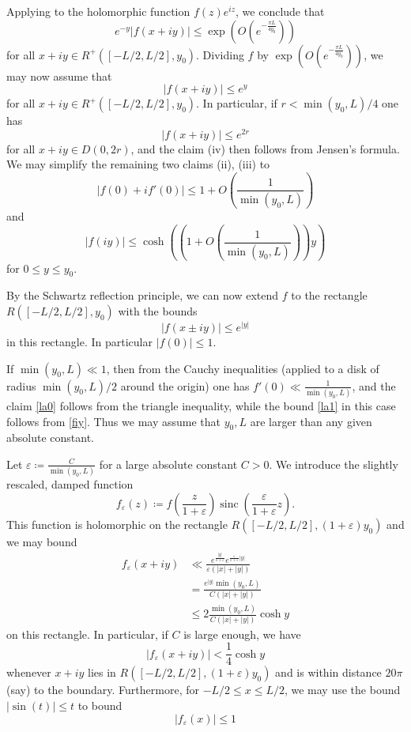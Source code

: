 \documentclass[12pt]{amsart}
\newcommand{\eps}{\varepsilon}
\newcommand{\sinc}{\operatorname{sinc}}
\begin{document}
Applying  to the holomorphic function $f(z) e^{iz}$, we conclude that
$$
 e^{-y} |f(x + iy)| \leq \exp\left(O( e^{-\frac{\pi L}{4y_0}} )\right)
$$
for all $x+iy \in R^+([-L/2,L/2], y_0)$.  Dividing $f$ by $\exp\left(O( e^{-\frac{\pi L}{4y_0}} )\right)$, we may now assume that
\begin{equation}\label{fiy}
 |f(x + iy)| \leq e^y
\end{equation}
for all $x+iy \in R^+([-L/2,L/2], y_0)$.  In particular, if $r < \min(y_0,L)/4$ one has
$$ |f(x+iy)| \leq e^{2r}$$
for all $x+iy \in D(0,2r)$, and the claim (iv) then follows from Jensen's formula.  We may simplify the remaining two claims (ii), (iii) to
\begin{equation}\label{la0}
 |f(0) + i f'(0)| \leq 1 + O\left(\frac{1}{\min(y_0,L)}\right)
\end{equation}
and
\begin{equation}\label{la1}
     |f(iy)| \leq \cosh \left( \left( 1 + O\left(\frac{1}{\min(y_0,L)}\right) \right) y\right)
\end{equation}
for $0 \leq y \leq y_0$.

By the Schwartz reflection principle, we can now extend $f$ to the rectangle $R([-L/2,L/2], y_0)$
with the bounds
$$ |f(x \pm iy)| \leq e^{|y|}$$
in this rectangle. In particular $|f(0)| \leq 1$.

If $\min(y_0,L) \ll 1$, then from the Cauchy inequalities (applied to a disk of radius $\min(y_0,L)/2$ around the origin) one has $f'(0) \ll \frac{1}{\min(y_0,L)}$, and the claim \eqref{la0} follows from the triangle inequality, while the bound \eqref{la1} in this case follows from \eqref{fiy}.  Thus we may assume that $y_0, L$ are larger than any given absolute constant.

Let $\eps \coloneqq \frac{C}{\min(y_0,L)}$ for a large absolute constant $C>0$.  We introduce the slightly rescaled, damped function
\begin{equation}\label{feps-def}
 f_{\eps}(z) \coloneqq f\left(\frac{z}{1+\eps}\right) \sinc\left(\frac{\eps}{1+\eps} z\right).
\end{equation}
This function is holomorphic on the rectangle $R([-L/2,L/2], (1+\eps) y_0)$
and we may bound
\begin{align*}
f_{\eps}(x+iy) &\ll \frac{e^{\frac{|y|}{1+\eps}} e^{\frac{\eps}{1+\eps} |y|}}{\eps (|x| + |y|)} \\
&= \frac{e^{|y|} \min(y_0,L)}{C(|x| + |y|)} \\
&\leq 2 \frac{\min(y_0,L)}{C(|x| + |y|)} \cosh y
\end{align*}
on this rectangle.  In particular, if $C$ is large enough, we have
\begin{equation}\label{f14}
 |f_{\eps}(x+iy)| < \frac{1}{4} \cosh y
\end{equation}
whenever $x+iy$ lies in $R([-L/2,L/2], (1+\eps) y_0)$ and is within distance $20\pi$ (say) to the boundary. Furthermore, for $-L/2 \leq x \leq L/2$, we may use the bound $|\sin(t)| \leq t$ to bound
\begin{equation}\label{feps}
 |f_{\eps}(x)| \leq 1
\end{equation}
\end{document}
